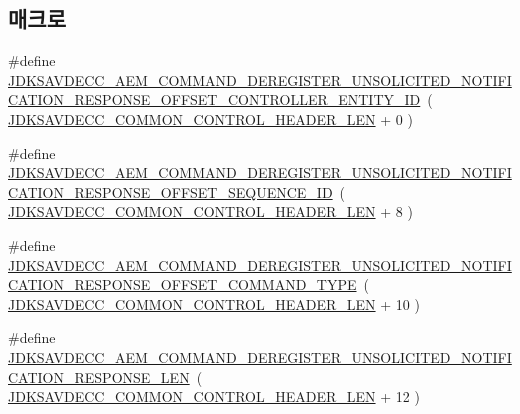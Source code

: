 \subsection*{매크로}
\begin{DoxyCompactItemize}
\item 
\#define \hyperlink{group__command__deregister__unsolicited__notification__response_gacbbbf0472a092695c4d62827b6c71922}{J\+D\+K\+S\+A\+V\+D\+E\+C\+C\+\_\+\+A\+E\+M\+\_\+\+C\+O\+M\+M\+A\+N\+D\+\_\+\+D\+E\+R\+E\+G\+I\+S\+T\+E\+R\+\_\+\+U\+N\+S\+O\+L\+I\+C\+I\+T\+E\+D\+\_\+\+N\+O\+T\+I\+F\+I\+C\+A\+T\+I\+O\+N\+\_\+\+R\+E\+S\+P\+O\+N\+S\+E\+\_\+\+O\+F\+F\+S\+E\+T\+\_\+\+C\+O\+N\+T\+R\+O\+L\+L\+E\+R\+\_\+\+E\+N\+T\+I\+T\+Y\+\_\+\+ID}~( \hyperlink{group__jdksavdecc__avtp__common__control__header_gaae84052886fb1bb42f3bc5f85b741dff}{J\+D\+K\+S\+A\+V\+D\+E\+C\+C\+\_\+\+C\+O\+M\+M\+O\+N\+\_\+\+C\+O\+N\+T\+R\+O\+L\+\_\+\+H\+E\+A\+D\+E\+R\+\_\+\+L\+EN} + 0 )
\item 
\#define \hyperlink{group__command__deregister__unsolicited__notification__response_ga5703b706228a25db84041ff7806cff4f}{J\+D\+K\+S\+A\+V\+D\+E\+C\+C\+\_\+\+A\+E\+M\+\_\+\+C\+O\+M\+M\+A\+N\+D\+\_\+\+D\+E\+R\+E\+G\+I\+S\+T\+E\+R\+\_\+\+U\+N\+S\+O\+L\+I\+C\+I\+T\+E\+D\+\_\+\+N\+O\+T\+I\+F\+I\+C\+A\+T\+I\+O\+N\+\_\+\+R\+E\+S\+P\+O\+N\+S\+E\+\_\+\+O\+F\+F\+S\+E\+T\+\_\+\+S\+E\+Q\+U\+E\+N\+C\+E\+\_\+\+ID}~( \hyperlink{group__jdksavdecc__avtp__common__control__header_gaae84052886fb1bb42f3bc5f85b741dff}{J\+D\+K\+S\+A\+V\+D\+E\+C\+C\+\_\+\+C\+O\+M\+M\+O\+N\+\_\+\+C\+O\+N\+T\+R\+O\+L\+\_\+\+H\+E\+A\+D\+E\+R\+\_\+\+L\+EN} + 8 )
\item 
\#define \hyperlink{group__command__deregister__unsolicited__notification__response_ga3cd41f4b98b3835cff56f96d2e33a681}{J\+D\+K\+S\+A\+V\+D\+E\+C\+C\+\_\+\+A\+E\+M\+\_\+\+C\+O\+M\+M\+A\+N\+D\+\_\+\+D\+E\+R\+E\+G\+I\+S\+T\+E\+R\+\_\+\+U\+N\+S\+O\+L\+I\+C\+I\+T\+E\+D\+\_\+\+N\+O\+T\+I\+F\+I\+C\+A\+T\+I\+O\+N\+\_\+\+R\+E\+S\+P\+O\+N\+S\+E\+\_\+\+O\+F\+F\+S\+E\+T\+\_\+\+C\+O\+M\+M\+A\+N\+D\+\_\+\+T\+Y\+PE}~( \hyperlink{group__jdksavdecc__avtp__common__control__header_gaae84052886fb1bb42f3bc5f85b741dff}{J\+D\+K\+S\+A\+V\+D\+E\+C\+C\+\_\+\+C\+O\+M\+M\+O\+N\+\_\+\+C\+O\+N\+T\+R\+O\+L\+\_\+\+H\+E\+A\+D\+E\+R\+\_\+\+L\+EN} + 10 )
\item 
\#define \hyperlink{group__command__deregister__unsolicited__notification__response_ga6b1095fb900d4ad3d966caa72cde2dca}{J\+D\+K\+S\+A\+V\+D\+E\+C\+C\+\_\+\+A\+E\+M\+\_\+\+C\+O\+M\+M\+A\+N\+D\+\_\+\+D\+E\+R\+E\+G\+I\+S\+T\+E\+R\+\_\+\+U\+N\+S\+O\+L\+I\+C\+I\+T\+E\+D\+\_\+\+N\+O\+T\+I\+F\+I\+C\+A\+T\+I\+O\+N\+\_\+\+R\+E\+S\+P\+O\+N\+S\+E\+\_\+\+L\+EN}~( \hyperlink{group__jdksavdecc__avtp__common__control__header_gaae84052886fb1bb42f3bc5f85b741dff}{J\+D\+K\+S\+A\+V\+D\+E\+C\+C\+\_\+\+C\+O\+M\+M\+O\+N\+\_\+\+C\+O\+N\+T\+R\+O\+L\+\_\+\+H\+E\+A\+D\+E\+R\+\_\+\+L\+EN} + 12 )
\end{DoxyCompactItemize}
